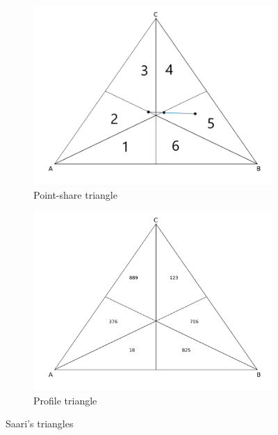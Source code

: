 \documentclass[hidelinks,11pt]{article} \usepackage[utf8]{inputenc}
\begin{document}
\begin{figure}[!h] \centering
  \begin{subfigure}[b]{0.49\textwidth} \centering
\includegraphics[width=\textwidth]{./images/simpletriangle.png}
 \caption{Point-share triangle}
 \label{fig:pointshare}
\end{subfigure} \hfill
  \begin{subfigure}[b]{0.49\textwidth} \centering
\includegraphics[width=\textwidth]{./images/representation_triangle_noth}
 \caption{Profile triangle}
 \label{fig:representation}
\end{subfigure}
\caption{Saari's triangles}
\label{fig:saari_nurmi}
\end{figure}
\end{document}
